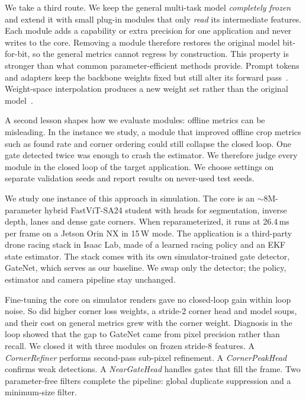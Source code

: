 \documentclass[10pt,twocolumn,letterpaper]{article}
\begin{document}
We take a third route. We keep the general multi-task model \emph{completely frozen} and extend it with small plug-in modules that only \emph{read} its intermediate features. Each module adds a capability or extra precision for one application and never writes to the core. Removing a module therefore restores the original model bit-for-bit, so the general metrics cannot regress by construction. This property is stronger than what common parameter-efficient methods provide. Prompt tokens and adapters keep the backbone weights fixed but still alter its forward pass~\cite{Jia2022VisualPrompt,Chen2022AdaptformerAdapting,Chen2022VisionTransformer}. Weight-space interpolation produces a new weight set rather than the original model~\cite{Wortsman2021RobustFinetuning}.

A second lesson shapes how we evaluate modules: offline metrics can be misleading. In the instance we study, a module that improved offline crop metrics such as found rate and corner ordering could still collapse the closed loop. One gate detected twice was enough to crash the estimator. We therefore judge every module in the closed loop of the target application. We choose settings on separate validation seeds and report results on never-used test seeds.

We study one instance of this approach in simulation. The core is an $\sim$8M-parameter hybrid FastViT-SA24 student with heads for segmentation, inverse depth, lanes and dense gate corners. When reparameterized, it runs at 26.4\,ms per frame on a Jetson Orin NX in 15\,W mode. The application is a third-party drone racing stack in Isaac Lab, made of a learned racing policy and an EKF state estimator. The stack comes with its own simulator-trained gate detector, GateNet, which serves as our baseline. We swap only the detector; the policy, estimator and camera pipeline stay unchanged.

Fine-tuning the core on simulator renders gave no closed-loop gain within loop noise. So did higher corner loss weights, a stride-2 corner head and model soups, and their cost on general metrics grew with the corner weight. Diagnosis in the loop showed that the gap to GateNet came from pixel precision rather than recall. We closed it with three modules on frozen stride-8 features. A \emph{CornerRefiner} performs second-pass sub-pixel refinement. A \emph{CornerPeakHead} confirms weak detections. A \emph{NearGateHead} handles gates that fill the frame. Two parameter-free filters complete the pipeline: global duplicate suppression and a minimum-size filter.
\end{document}
